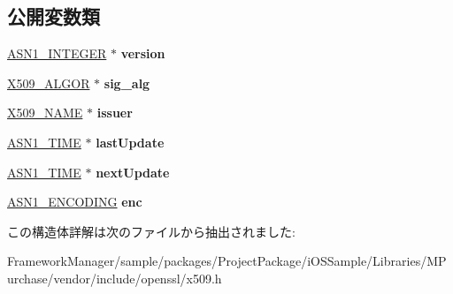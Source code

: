 \subsection*{公開変数類}
\begin{DoxyCompactItemize}
\item 
\hypertarget{struct_x509__crl__info__st_a12cb6a18829a8d4deee72ead8ff4c4e9}{}\hyperlink{structasn1__string__st}{A\+S\+N1\+\_\+\+I\+N\+T\+E\+G\+E\+R} $\ast$ {\bfseries version}\label{struct_x509__crl__info__st_a12cb6a18829a8d4deee72ead8ff4c4e9}

\item 
\hypertarget{struct_x509__crl__info__st_a9f9d7f31d09d6f5dfd60866725a6d137}{}\hyperlink{struct_x509__algor__st}{X509\+\_\+\+A\+L\+G\+O\+R} $\ast$ {\bfseries sig\+\_\+alg}\label{struct_x509__crl__info__st_a9f9d7f31d09d6f5dfd60866725a6d137}

\item 
\hypertarget{struct_x509__crl__info__st_aae3a87ee2ba5f6fb7dce53ad9c5fd41f}{}\hyperlink{struct_x509__name__st}{X509\+\_\+\+N\+A\+M\+E} $\ast$ {\bfseries issuer}\label{struct_x509__crl__info__st_aae3a87ee2ba5f6fb7dce53ad9c5fd41f}

\item 
\hypertarget{struct_x509__crl__info__st_a08aec2ca3fe248541ad5fabbc5cb4762}{}\hyperlink{structasn1__string__st}{A\+S\+N1\+\_\+\+T\+I\+M\+E} $\ast$ {\bfseries last\+Update}\label{struct_x509__crl__info__st_a08aec2ca3fe248541ad5fabbc5cb4762}

\item 
\hypertarget{struct_x509__crl__info__st_ac6c7bfd0eb7eb97b75a65ad68ebbea86}{}\hyperlink{structasn1__string__st}{A\+S\+N1\+\_\+\+T\+I\+M\+E} $\ast$ {\bfseries next\+Update}\label{struct_x509__crl__info__st_ac6c7bfd0eb7eb97b75a65ad68ebbea86}

\item 
\hypertarget{struct_x509__crl__info__st_a71a2decf2c34f6f0bbb91dbe42479784}{}\hyperlink{struct_a_s_n1___e_n_c_o_d_i_n_g__st}{A\+S\+N1\+\_\+\+E\+N\+C\+O\+D\+I\+N\+G} {\bfseries enc}\label{struct_x509__crl__info__st_a71a2decf2c34f6f0bbb91dbe42479784}

\end{DoxyCompactItemize}


この構造体詳解は次のファイルから抽出されました\+:\begin{DoxyCompactItemize}
\item 
Framework\+Manager/sample/packages/\+Project\+Package/i\+O\+S\+Sample/\+Libraries/\+M\+Purchase/vendor/include/openssl/x509.\+h\end{DoxyCompactItemize}
